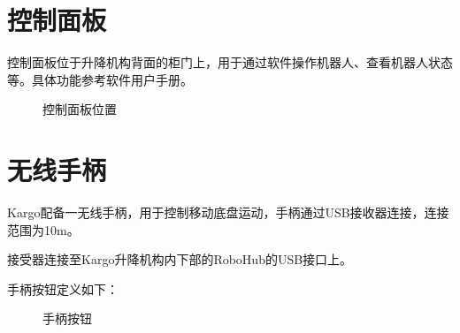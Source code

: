 \documentclass[a4paper,11pt,english,openany,oneside]{sphinxmanual}
\begin{document}
\section{控制面板}
\label{\detokenize{07 _u6280_u672f_u89c4_u683c:id39}}\label{\detokenize{07 _u6280_u672f_u89c4_u683c:id40}}
\sphinxAtStartPar
控制面板位于升降机构背面的柜门上，用于通过软件操作机器人、查看机器人状态等。具体功能参考软件用户手册。

\begin{figure}[H]
\centering
\capstart

\noindent{}
\caption{控制面板位置}\label{\detokenize{07 _u6280_u672f_u89c4_u683c:id77}}\end{figure}




\section{无线手柄}
\label{\detokenize{07 _u6280_u672f_u89c4_u683c:id41}}\label{\detokenize{07 _u6280_u672f_u89c4_u683c:id42}}
\sphinxAtStartPar
Kargo配备一无线手柄，用于控制移动底盘运动，手柄通过USB接收器连接，连接范围为10m。

\sphinxAtStartPar
接受器连接至Kargo升降机构内下部的RoboHub的USB接口上。

\sphinxAtStartPar
手柄按钮定义如下：

\begin{figure}[H]
\centering
\capstart

\noindent{}
\caption{手柄按钮}\label{\detokenize{07 _u6280_u672f_u89c4_u683c:id78}}\end{figure}
\end{document}
